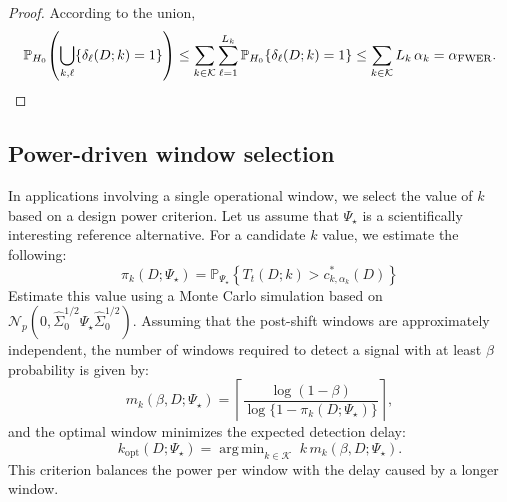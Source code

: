 \documentclass[11pt,a4paper]{article}
\DeclareMathOperator*{\argmin}{arg\,min}
\newcommand{\Prob}{\mathbb{P}}
\newcommand{\calN}{\mathcal{N}}
\begin{document}
\begin{proof}
According to the union,
\[
\Prob_{H_{0}}\!\left(\bigcup_{k,\ell}\{\delta_{\ell}(D;k)=1\}\right)
\leq
\sum_{k\in\mathcal{K}}\sum_{\ell=1}^{L_{k}}
\Prob_{H_{0}}\{\delta_{\ell}(D;k)=1\}
\leq
\sum_{k\in\mathcal{K}} L_{k}\,\alpha_{k}
= \alpha_{\mathrm{FWER}}.
\qedhere
\]
\end{proof}

\subsection{Power-driven window selection}

In applications involving a single operational window, we select the value of $k$ based on a
design power criterion. Let us assume that $\Psi_{\star}$ is a scientifically interesting
reference alternative. For a candidate $k$ value, we estimate the following:
\begin{equation}
\pi_{k}(D;\Psi_{\star})
= \Prob_{\Psi_{\star}}\!\left\{T_{t}(D;k) > c_{k,\alpha_{k}}^{*}(D)\right\}
\label{eq:pi-k}
\end{equation}
Estimate this value using a Monte Carlo simulation based on $\calN_{p}(0,\widehat{\Sigma}_{0}^{1/2}\Psi_{\star}\widehat{\Sigma}_{0}^{1/2})$.
Assuming that the post-shift windows are approximately independent, the number of windows required to detect a signal with at least $\beta$ probability
is given by:
\begin{equation}
m_{k}(\beta,D;\Psi_{\star})
= \left\lceil\frac{\log(1-\beta)}{\log\{1-\pi_{k}(D;\Psi_{\star})\}}\right\rceil,
\label{eq:m-k}
\end{equation}
and the optimal window minimizes the expected detection delay:
\begin{equation}
k_{\mathrm{opt}}(D;\Psi_{\star})
= \argmin_{k\in\mathcal{K}}\; k\,m_{k}(\beta,D;\Psi_{\star}).
\label{eq:kopt}
\end{equation}
This criterion balances the power per window with the delay
caused by a longer window.
\end{document}

